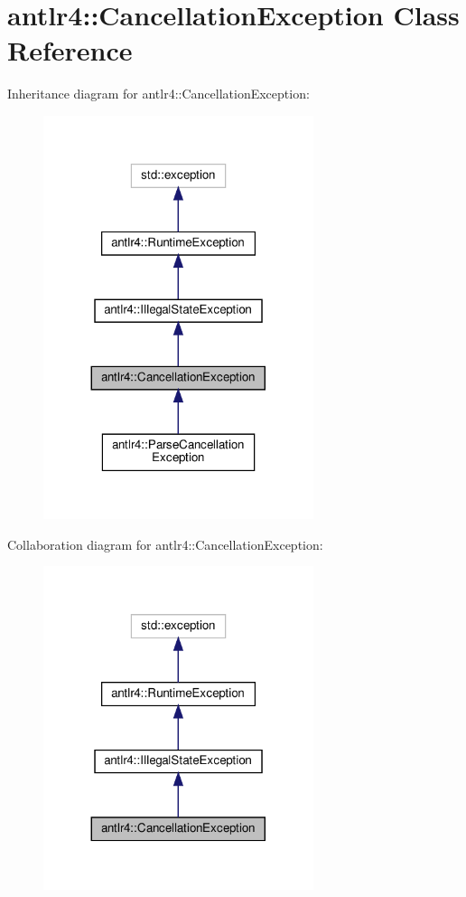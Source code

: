 \hypertarget{classantlr4_1_1CancellationException}{}\section{antlr4\+:\+:Cancellation\+Exception Class Reference}
\label{classantlr4_1_1CancellationException}


Inheritance diagram for antlr4\+:\+:Cancellation\+Exception\+:
\nopagebreak
\begin{figure}[H]
\begin{center}
\leavevmode
\includegraphics[width=224pt]{classantlr4_1_1CancellationException__inherit__graph}
\end{center}
\end{figure}


Collaboration diagram for antlr4\+:\+:Cancellation\+Exception\+:
\nopagebreak
\begin{figure}[H]
\begin{center}
\leavevmode
\includegraphics[width=224pt]{classantlr4_1_1CancellationException__coll__graph}
\end{center}
\end{figure}
